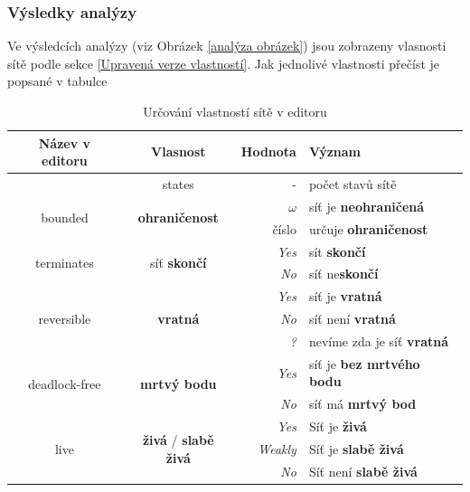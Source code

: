 \documentclass[
  biblatex,
  glossaries,
  index
]{kidiplom}
\begin{document}
\subsubsection{Výsledky analýzy}\label{výsledky analýzy}

Ve výsledcích analýzy (viz Obrázek \ref{analýza obrázek}) jsou zobrazeny vlasnosti sítě podle sekce \ref{Upravená verze vlastností}.
Jak jednolivé vlastnosti přečíst je popsané v tabulce 

\begin{table}[h]
  \centering
  \begin{tabular}{| c | c | r l |}
  \hline
    Název v editoru & Vlasnost & Hodnota & Význam \\
    \hline
    \hline
    & states & - & počet stavů sítě \\ 
    \hline
    \multirow{2}{*}{bounded} & \multirow{2}{*}{\textbf{ohraničenost}} & \textit{$\omega$} &  síť je \textbf{neohraničená} \\ 
    &                   & číslo & určuje \textbf{ohraničenost} \\ 
    \hline
\multirow{2}{*}{terminates} & \multirow{2}{*}{síť \textbf{skončí}} & \textit{Yes} & sít \textbf{skončí} \\ 
    &                   & \textit{No} & síť ne\textbf{skončí} \\ 
    \hline
\multirow{3}{*}{reversible} & \multirow{3}{*}{\textbf{vratná}} & \textit{Yes} & síť je \textbf{vratná} \\ 
    &                   &   \textit{No} & síť není \textbf{vratná}  \\
    &                   & \textit{?} & nevíme zda je síť \textbf{vratná} \\ 
    \hline
\multirow{2}{*}{deadlock-free} & \multirow{2}{*}{\textbf{mrtvý bodu}} & \textit{Yes} & síť je \textbf{bez mrtvého bodu} \\ 
    &                   &  \textit{No} & síť má \textbf{mrtvý bod}  \\ 
    \hline
\multirow{3}{*}{live} & \multirow{3}{*}{\textbf{živá} / \textbf{slabě živá}} 
                         & \textit{Yes} & Síť je \textbf{živá} \\ 
    &                   & \textit{Weakly}  & Síť je \textbf{slabě živá} \\ 
    &                   & \textit{No} & Síť není \textbf{slabě živá} \\ 
    \hline

  \end{tabular}
  \caption{Určování vlastností sítě v editoru} \label{}  
\end{table}
\end{document}
